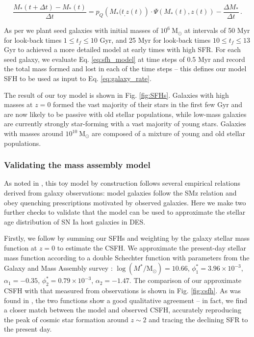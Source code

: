 \documentclass[fleqn,usenatbib]{mnras}
\begin{document}
\begin{equation}
    \frac{M_*(t+\Delta t) - M_*(t)}{\Delta t} = p_Q\left(M_*(t_,z(t)\right)\cdot\Psi(M_*(t),z(t)) - \frac{\Delta M_*}{\Delta t}\,.
    \label{eq:sfh_model}
\end{equation}


As per  we plant seed galaxies with initial masses of $10^6 ~\mathrm{M}_{\odot}$ at intervals of 50 Myr for look-back times $1 \leq t_f \leq 10$ Gyr, and 25 Myr for look-back times $10 \leq t_f \leq 13$ Gyr to achieved a more detailed model at early times with high SFR. For each seed galaxy, we evaluate Eq. \ref{eq:sfh_model} at time steps of 0.5 Myr and record the total mass formed and lost in each of the time steps -- this defines our model SFH to be used as input to Eq. \ref{eq:galaxy_rate}.

The result of our toy model is shown in Fig. \ref{fig:SFHs}. Galaxies with high masses at $z=0$ formed the vast majority of their stars in the first few Gyr and are now likely to be passive with old stellar populations, while low-mass galaxies are currently strongly star-forming with a vast majority of young stars. Galaxies with masses around $10^{10}~\mathrm{M}_{\odot}$ are composed of a mixture of young and old stellar populations. 
\subsubsection{Validating the mass assembly model \label{subsubsec:validate_c14}}

As noted in , this toy model by construction follows several empirical relations derived from galaxy observations: model galaxies follow the SMz relation and obey quenching prescriptions motivated by observed galaxies. Here we make two further checks to validate that the model can be used to approximate the stellar age distribution of SN Ia host galaxies in DES.

Firstly, we follow  by summing our SFHs and weighting by the galaxy stellar mass function at $z=0$ to estimate the CSFH. We approximate the present-day stellar mass function according to a double Schechter function with parameters from the Galaxy and Mass Assembly survey \citet{Baldry2018}: $\log(M^*/\mathrm{M}_{\odot})=10.66$, $\phi^*_1=3.96\times10^{-3}$, $\alpha_1=-0.35$, $\phi^*_2=0.79\times10^{-3}$, $\alpha_2=-1.47$.
The comparison of our approximate CSFH with that measured from observations \citep{Madau2014} is shown in Fig. \ref{fig:csfh}. As was found in , the two functions show a good qualitative agreement -- in fact, we find a closer match between the model and observed CSFH, accurately reproducing the peak of cosmic star formation around $z\sim2$ and tracing the declining SFR to the present day.
\end{document}
